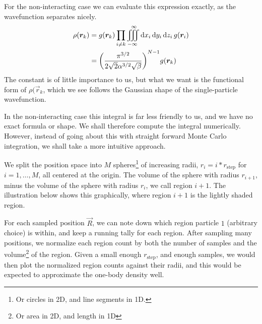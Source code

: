 \documentclass[a4paper, 11pt]{article}
\begin{document}
\begin{multicols}{2}
For the non-interacting case we can evaluate this expression exactly, as the
wavefunction separates nicely.
\begin{align}
    \begin{split}
        \rho(\bm r_k)&=g(\bm r_k)\prod_{i\neq k}\iiint_{-\infty}^\infty
        \dd{x_i}\dd{y_i}\dd{z_i}g(\bm r_i)\\
        &= \qty(\frac{\pi^{3/2}}{2\sqrt{2}\alpha^{3/2}\sqrt{\beta}})^{N-1}
        g(\bm r_k)\\
    \end{split}\label{eq:one-body-exact}
\end{align}
The constant is of little importance to us, but what we want is the functional
form of $\rho(\vec r_k$, which we see follows the Gaussian shape of the
single-particle wavefunction.

In the non-interacting case this integral is far less friendly to us, and we have no
exact formula or shape. We shall therefore compute the integral numerically. However, 
instead of going about this with straight forward Monte Carlo integration, we
shall take a more intuitive approach.

We split the position space into $M$ spheres\footnote{Or circles in 2D, and line
segments in 1D.} of increasing radii, $r_i=i * r_\text{step}$ for $i=1,\dots,M$,
all centered at the origin. The volume of the sphere with radius $r_{i+1}$, minus
the volume of the sphere with radius $r_i$, we call region $i+1$. The
illustration below shows this graphically, where region $i+1$ is the lightly
shaded region.

\begin{center}
\end{center}

For each sampled position $\vec R$, we can note down which region particle $1$
(arbitrary choice) is within, and keep a running tally for each region. After
sampling many positions, we normalize each region count by both the number of
samples and the volume\footnote{Or area in 2D, and length in 1D} of the
region. Given a small enough $r_\text{step}$, and enough samples, we would then
plot the normalized region counts against their radii, and this would be expected
to approximate the one-body density well.


\end{multicols}
\end{document}
